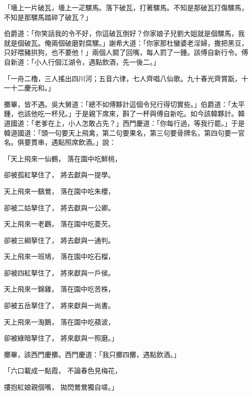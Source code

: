 「墻上一片破瓦，墻上一疋騾馬。落下破瓦，打著騾馬。不知是那破瓦打傷騾馬，不知是那騾馬踏碎了破瓦？」

伯爵道：「你笑話我的令不好，你這破瓦倒好？你家娘子兒劉大姐就是個騾馬，我就是個破瓦。俺兩個破磨對腐騾。」謝希大道：「你家那杜蠻婆老淫婦，撒把黑豆，只好喂豬拱狗，也不要他！」兩個人鬬了回嘴，每人罰了一鍾。該傅自新行令。傅自新道：「小人行個江湖令，遇點飲酒，先一後二。」

「一舟二櫓，三人搖出四川河；五音六律，七人齊唱八仙歌。九十春光齊賞翫，十一十二慶元和。」

擲畢，皆不遇。吳大舅道：「總不如傅黟計這個令兒行得切實些。」伯爵道：「太平鍾，也該他吃一杯兒。」于是親下席來，斟了一杯與傅自新吃。如今該韓夥計。韓道國道：「老爹在上，小人怎敢占先？」西門慶道：「你每行過，等我行罷。」于是韓道國道：「頭一句要天上飛禽，第二句要果名，第三句要骨牌名，第四句要一官名。俱要貫串，遇點照席飲酒。」說：

「天上飛來一仙鶴，  落在園中吃鮮桃，

卻被孤紅拏住了，  將去獻與一提學。

天上飛來一鷂鶯，  落在園中吃朱櫻，

卻被二姑拏住了，  將去獻與一公卿。

天上飛來一老鸛，  落在園中吃菱芡。

卻被三綱拏住了，  將去獻與一通判。

天上飛來一班鳩，  落在園中吃石榴，

卻被四紅拏住了，  將來獻與一戶侯。

天上飛來一錦雞，  落在園中吃苦株，

卻被五岳拏住了，  將來獻與一尚書。

天上飛來一淘鵝，  落在園中吃蘋波，

卻被綠暗拏住了，  將來獻與一照磨。」

擲畢，該西門慶擲。西門慶道：「我只擲四擲，遇點飲酒。」

「六口載成一點霞，  不論春色見梅花，

摟抱紅娘親個嘴，  拋閃鶯鶯獨自嗟。」

